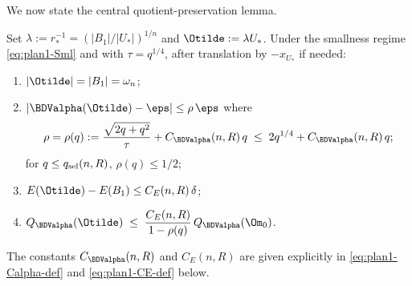 We now state the central quotient-preservation lemma.

\begin{lemma}
\label{lem:plan1-sel-L3}
Set $\lambda:=r_*^{-1}=(|B_1|/|U_*|)^{1/n}$ and
$\Otilde:=\lambda U_*$. Under the smallness regime
\eqref{eq:plan1-Sml} and with $\tau=q^{1/4}$, after translation by
$-x_{U_*}$ if needed:
\begin{enumerate}
\item[\rm(a)] $|\Otilde|=|B_1|=\omega_n$;
\item[\rm(b)] $|\BDValpha(\Otilde)-\eps|\le \rho\,\eps$ where
\begin{equation}\label{eq:plan1-rho}
\rho=\rho(q)
:=\frac{\sqrt{2q+q^{2}}}{\tau}+C_{\BDValpha}(n,R)\,q
\;\le\;2q^{1/4}+C_{\BDValpha}(n,R)\,q;
\end{equation}
for $q\le q_{\rm sel}(n,R)$, $\rho(q)\le 1/2$;
\item[\rm(c)] $E(\Otilde)-E(B_1)\le C_E(n,R)\,\delta$;
\item[\rm(d)] $\displaystyle Q_{\BDValpha}(\Otilde)\;\le\;
\frac{C_E(n,R)}{1-\rho(q)}\,Q_{\BDValpha}(\Om_0)$.
\end{enumerate}
The constants $C_{\BDValpha}(n,R)$ and $C_E(n,R)$ are given
explicitly in \eqref{eq:plan1-Calpha-def} and
\eqref{eq:plan1-CE-def} below.
\end{lemma}

